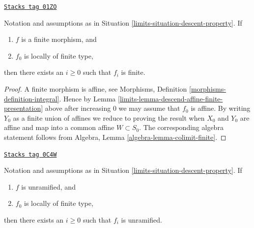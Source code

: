 \begin{lemma}
\label{limits-lemma-descend-finite-finite-presentation}
\href{https://stacks.math.columbia.edu/tag/01ZO}{\texttt{Stacks tag 01ZO}}

Notation and assumptions as in Situation \ref{limits-situation-descent-property}.
If
\begin{enumerate}
\item $f$ is a finite morphism, and
\item $f_0$ is locally of finite type,
\end{enumerate}
then there exists an $i \geq 0$ such that $f_i$ is finite.
\end{lemma}

\begin{proof}

A finite morphism is affine, see
Morphisms, Definition \ref{morphisms-definition-integral}.
Hence by Lemma \ref{limits-lemma-descend-affine-finite-presentation} above
after increasing $0$ we may assume that $f_0$ is affine.
By writing $Y_0$ as a finite union of affines we reduce to proving
the result when $X_0$ and $Y_0$ are affine and map
into a common affine $W \subset S_0$. The corresponding algebra
statement follows from Algebra, Lemma \ref{algebra-lemma-colimit-finite}.
\end{proof}

\begin{lemma}
\label{limits-lemma-descend-unramified}
\href{https://stacks.math.columbia.edu/tag/0C4W}{\texttt{Stacks tag 0C4W}}

Notation and assumptions as in Situation \ref{limits-situation-descent-property}.
If
\begin{enumerate}
\item $f$ is unramified, and
\item $f_0$ is locally of finite type,
\end{enumerate}
then there exists an $i \geq 0$ such that $f_i$ is unramified.
\end{lemma}

